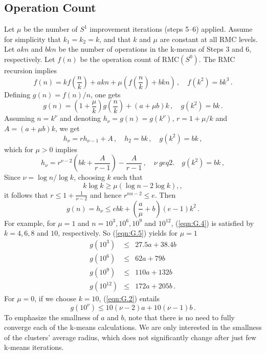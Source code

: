 \documentclass{article} %
\begin{document}
\subsection{Operation Count}
\label{sec:G.2}
Let $\mu$ be the number of $S^1$ improvement iterations (steps 5--6) applied. Assume for simplicity that $k_1 = k_2 = k$, and that $k$ and $\mu$ are constant at all RMC levels. Let $a k n$ and $b k n$ be the number of operations in the k-means of Steps 3 and 6, respectively. Let $f(n)$ be the operation count of $\text{RMC}(S^0)$. The RMC recursion implies
$$ f(n) = k f\left( \frac{n}{k} \right) + a k n + \mu \left(f\left( \frac{n}{k} \right) + b k n\right)\,, \quad f(k^2) = b k ^3\,. $$
Defining $g(n) = f(n)/n$, one gets
\begin{equation}
    g(n) = \left(1 + \frac{\mu}{k}\right) g\left( \frac{n}{k} \right) + (a + \mu b) k\,,
    \quad g(k^2) = b k\,.
    \label{eqn:G.1}
\end{equation}
Assuming $n = k^{\nu}$ and denoting $h_{\nu} = g(n) = g(k^{\nu})$, $r = 1 + \mu/k$ and $A = (a + \mu b)k$, we get
\begin{equation}
    h_{\nu} = r h_{\nu-1} + A\,,\quad h_2 = b k\,,
    \quad g(k^2) = b k\,,
    \label{eqn:G.2}
\end{equation}
which for $\mu > 0$ implies
\begin{equation}
    h_{\nu} = r^{\nu-2} \left( b k + \frac{A}{r-1} \right) - \frac{A}{r-1}\,, \quad \nu \ geq 2.
    \quad g(k^2) = b k\,,
    \label{eqn:G.3}
\end{equation}
Since $\nu = \log n / \log k$, choosing $k$ such that
\begin{equation}
    k \log k \geq \mu \left( \log n - 2 \log k\right),,
    \label{eqn:G.4}
\end{equation}
it follows that $r \leq 1 + \frac{1}{\nu-2}$ and hence $r^{nu-2} \leq e$. Then
\begin{equation}
    g(n) = h_{\nu} \leq e b k + \left( \frac{a}{\mu} + b \right) (e-1) k^2\,.
    \label{eqn:G.5}
\end{equation}
For example, for $\mu = 1$ and $n = 10^3, 10^6, 10^9$ and $10^{12}$, (\ref{eqn:G.4}) is satisfied by $k = 4,6,8$ and $10$, respectively. So (\ref{eqn:G.5}) yields for $\mu = 1$
\begin{align}
    g(10^3) &\leq& 27.5 a + 38.4 b \\
    g(10^6) &\leq& 62 a + 79 b \\
    g(10^9) &\leq& 110 a + 132 b \\
    g(10^12) &\leq& 172 a + 205 b\,.
    \label{eqn:G.6}
\end{align}
For $\mu = 0$, if we choose $k = 10$, (\ref{eqn:G.2}) entails
\begin{equation}
    g(10^{\nu}) \leq 10 (\nu - 2) a + 10 (\nu - 1) b\,.
    \label{eqn:G.7}
\end{equation}
To emphasize the smallness of $a$ and $b$, note that there is no need to fully converge each of the k-means calculations. We are only interested in the smallness of the clusters' average radius, which does not significantly change after just few k-means iterations.
\end{document}
